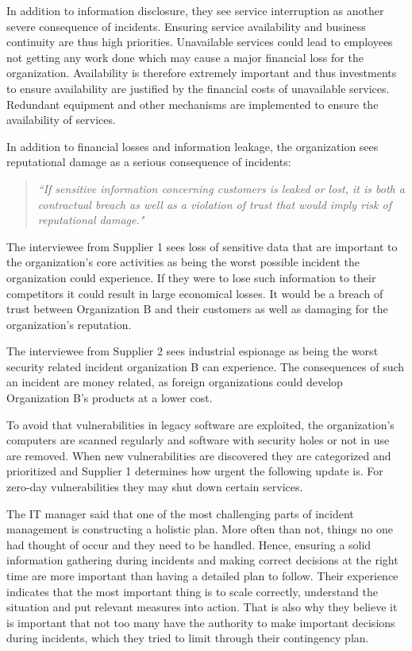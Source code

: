 \documentclass[b5paper, twoside, openright, 11pt]{report}
\begin{document}
In addition to information disclosure, they see service interruption as another severe consequence of incidents. Ensuring service availability and business continuity are thus high priorities. Unavailable services could lead to employees not getting any work done which may cause a major financial loss for the organization. Availability is therefore extremely important and thus investments to ensure availability are justified by the financial costs of unavailable services. Redundant equipment and other mechanisms are implemented to ensure the availability of services. 

In addition to financial losses and information leakage, the organization sees reputational damage as a serious consequence of incidents: 

\begin{quote}
\textit{``If sensitive information concerning customers is leaked or lost, it is both a contractual breach as well as a violation of trust that would imply risk of reputational damage."}
\end{quote}

The interviewee from Supplier 1 sees loss of sensitive data that are important to the organization's core activities as being the worst possible incident the organization could experience. If they were to lose such information to their competitors it could result in large economical losses. It would be a breach of trust between Organization B and their customers as well as damaging for the organization's reputation.	

The interviewee from Supplier 2 sees industrial espionage as being the worst security related incident organization B can experience. %
The consequences of such an incident are money related, as foreign organizations could develop Organization B's products at a lower cost. 

To avoid that vulnerabilities in legacy software are exploited, the organization's computers are scanned regularly and software with security holes or not in use are removed. When new vulnerabilities are discovered they are categorized and prioritized and Supplier 1 determines how urgent the following update is. For zero-day vulnerabilities they may shut down certain services.

The \acs{IT} manager said that one of the most challenging parts of incident management is constructing a holistic plan. More often than not, things no one had thought of occur and they need to be handled. Hence, ensuring a solid information gathering during incidents and making correct decisions at the right time are more important than having a detailed plan to follow. Their experience indicates that the most important thing is to scale correctly, understand the situation and put relevant measures into action. That is also why they believe it is important that not too many have the authority to make important decisions during incidents, which they tried to limit through their contingency plan.
\end{document}
